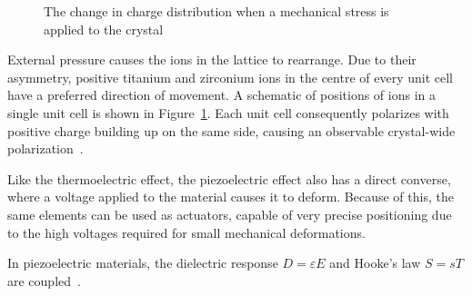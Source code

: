 \documentclass[a4paper,10pt]{article}
\begin{document}
\begin{figure}[!h]
  \centering

\hspace{1cm}
\caption{The change in charge distribution when a mechanical stress is applied to the crystal~\cite{cottone}}
\label{fig:piezo-theory}
\end{figure}

External pressure causes the ions in the lattice to rearrange. Due to their asymmetry, positive titanium and zirconium ions in the centre of every unit cell have a preferred direction of movement. A schematic of positions of ions in a single unit cell is shown in Figure~\ref{fig:piezo-theory}. Each unit cell consequently polarizes with positive charge building up on the same side, causing an observable crystal-wide polarization~\cite{cottone}. 

Like the thermoelectric effect, the piezoelectric effect also has a direct converse, where a voltage applied to the material causes it to deform. Because of this, the same elements can be used as actuators, capable of very precise positioning due to the high voltages required for small mechanical deformations. 

In piezoelectric materials, the dielectric response $D = \varepsilon E$ and Hooke's law $S = sT$ are coupled~\cite{wiki:piezo}. 
\end{document}
